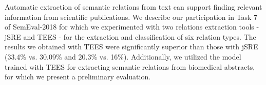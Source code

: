Automatic extraction of semantic relations from text can support finding relevant information from scientific publications. We describe our participation in Task 7 of SemEval-2018 for which we experimented with two relations extraction tools - jSRE and TEES - for the extraction and classification of six relation types. The results we obtained with TEES were significantly superior than those with jSRE (33.4\% vs. 30.09\% and 20.3\% vs. 16\%). Additionally, we utilized the model trained with TEES for extracting semantic relations from biomedical abstracts, for which we present a preliminary evaluation.
